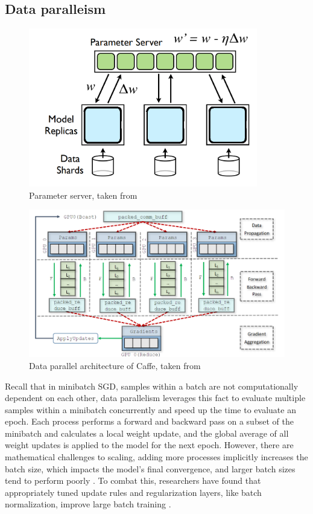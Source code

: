 \subsection{Data paralleism}
\begin{figure}
    \centering
    \includegraphics[width=10cm]{3_Chapters/3_Chapter_DistributedDL/Figs/parameter_server.png}
    \caption{Parameter server, taken from \cite{Dean2012DistBelif}}
    \label{fig:parameter-server}
\end{figure}

\begin{figure}
    \centering
    \includegraphics[width=15cm]{3_Chapters/3_Chapter_DistributedDL/Figs/Caffee_DP_arch.png}
    \caption{Data parallel architecture of Caffe, taken from \cite{Awan2017InDepthPerfCharOfDNN}}
    \label{fig:caffe-dp-arch}
\end{figure}
Recall that in minibatch SGD, samples within a batch are not computationally dependent on each other, data parallelism leverages this fact to evaluate multiple samples within a minibatch concurrently and speed up the time to evaluate an epoch. 
Each process performs a forward and backward pass on a subset of the minibatch and calculates a local weight update, and the global average of all weight updates is applied to the model for the next epoch.
However, there are mathematical challenges to scaling, adding more processes implicitly increases the batch size, which impacts the model's final convergence, and larger batch sizes tend to perform poorly \cite{Keskar2016LargeBatchTraining}.
To combat this, researchers have found that appropriately tuned update rules and regularization layers, like batch normalization, improve large batch training \cite{You2018ImgNetInMin, Goyal2017FacebookImgNet1Hour}. 

